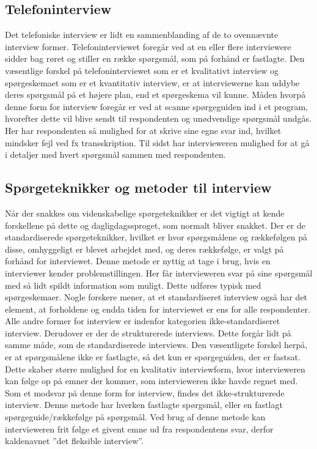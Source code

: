 \subsection{Telefoninterview}
Det telefoniske interview er lidt en sammenblanding af de to ovennævnte interview former. Telefoninterviewet foregår ved at en eller flere interviewere sidder bag røret og stiller en række spørgsmål, som på forhånd er fastlagte. Den væsentlige forskel på telefoninterviewet som er et kvalitativt interview og spørgeskemaet som er et kvantitativ interview, er at interviewerne kan uddybe deres spørgsmål på et højere plan, end et spørgeskema vil kunne. Måden hvorpå denne form for interview foregår er ved at scanne spørgeguiden ind i et program, hvorefter dette vil blive sendt til respondenten og unødvendige spørgsmål undgås. Her har respondenten så mulighed for at skrive sine egne svar ind, hvilket mindsker fejl ved fx transskription. Til sidst har intervieweren mulighed for at gå i detaljer med hvert spørgsmål sammen med respondenten.


\subsection{Spørgeteknikker og metoder til interview}
Når der snakkes om videnskabelige spørgeteknikker er det vigtigt at kende forskellene på dette og dagligdagssproget, som normalt bliver snakket. Der er de standardiserede spørgeteknikker, hvilket er hvor spørgsmålene og rækkefølgen på disse, omhyggeligt er blevet arbejdet med, og deres rækkefølge, er valgt på forhånd for interviewet. Denne metode er nyttig at tage i brug, hvis en interviewer kender problemstillingen. Her får intervieweren svar på sine spørgsmål med så lidt spildt information som muligt. Dette udføres typisk med spørgeskemaer. Nogle forskere mener, at et standardiseret interview også har det element, at forholdene og endda tiden for interviewet er ens for alle respondenter. Alle andre former for interview er indenfor kategorien ikke-standardiseret interview.
Derudover er der de strukturerede interviews. Dette forgår lidt på samme måde, som de standardiserede interviews. Den væsentligste forskel herpå, er at spørgsmålene ikke er fastlagte, så det kun er spørgeguiden, der er fastsat. Dette skaber større mulighed for en kvalitativ interviewform, hvor intervieweren kan følge op på emner der kommer, som intervieweren ikke havde regnet med. Som et modsvar på denne form for interview, findes det ikke-strukturerede interview. Denne metode har hverken fastlagte spørgsmål, eller en fastlagt spørgeguide/rækkefølge på spørgsmål. Ved brug af denne metode kan intervieweren frit følge et givent emne ud fra respondentens svar, derfor kaldenavnet  ”det fleksible interview”. 

